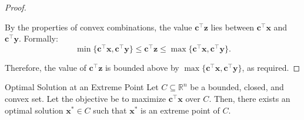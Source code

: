 \begin{proof}
\begin{center}
\end{center}

By the properties of convex combinations, the value \(\mathbf{c}^\top \mathbf{z}\) lies between \(\mathbf{c}^\top \mathbf{x}\) and \(\mathbf{c}^\top \mathbf{y}\). Formally:
\[
\min\{\mathbf{c}^\top \mathbf{x}, \mathbf{c}^\top \mathbf{y}\} \leq \mathbf{c}^\top \mathbf{z} \leq \max\{\mathbf{c}^\top \mathbf{x}, \mathbf{c}^\top \mathbf{y}\}.
\]

Therefore, the value of \(\mathbf{c}^\top \mathbf{z}\) is bounded above by \(\max\{\mathbf{c}^\top \mathbf{x}, \mathbf{c}^\top \mathbf{y}\}\), as required.
\end{proof}

\begin{theorem}{Optimal Solution at an Extreme Point}
\label{thm:extreme_point_optimum}
Let \(C \subseteq \mathbb{R}^n\) be a bounded, closed, and convex set. Let the objective be to maximize \(\mathbf{c}^\top \mathbf{x}\) over \(C\). Then, there exists an optimal solution \(\mathbf{x}^* \in C\) such that \(\mathbf{x}^*\) is an extreme point of \(C\).
\end{theorem}

